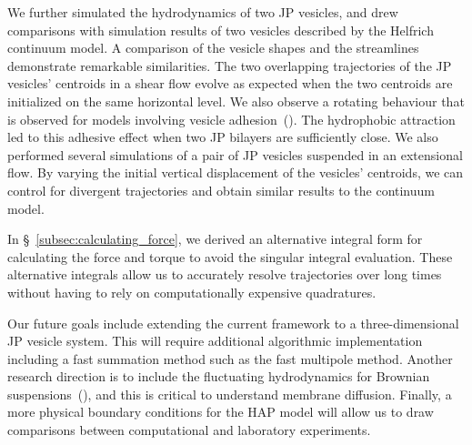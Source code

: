 \documentclass[lineno]{jfm}
\begin{document}

We further simulated the hydrodynamics of two JP vesicles, and drew
comparisons with simulation results of two vesicles described by the
Helfrich continuum model. A comparison of the vesicle shapes and the
streamlines demonstrate remarkable similarities. The two overlapping
trajectories of the JP vesicles' centroids in a shear flow evolve as
expected when the two centroids are initialized on the same horizontal
level. We also observe a rotating behaviour that is observed for models
involving vesicle adhesion~(\cite{qua-vee-you2019}). The hydrophobic
attraction led to this adhesive effect when two JP bilayers are
sufficiently close. We also performed several simulations of a pair of
JP vesicles suspended in an extensional flow. By varying the initial
vertical displacement of the vesicles' centroids, we can control for
divergent trajectories and obtain similar results to the continuum
model.

In \S~\ref{subsec:calculating_force}, we derived an alternative integral
form for calculating the force and torque to avoid the singular integral
evaluation. These alternative integrals allow us to accurately resolve
trajectories over long times without having to rely on computationally
expensive quadratures.

Our future goals include extending the current framework to a
three-dimensional JP vesicle system. This will require additional
algorithmic implementation including a fast summation method such as the
fast multipole method. Another research direction is to include the
fluctuating hydrodynamics for Brownian suspensions~(\cite{Bao2018}),
and this is critical to understand membrane diffusion. Finally, a more
physical boundary conditions for the HAP model will allow us to draw
comparisons between computational and laboratory experiments.
\end{document}
